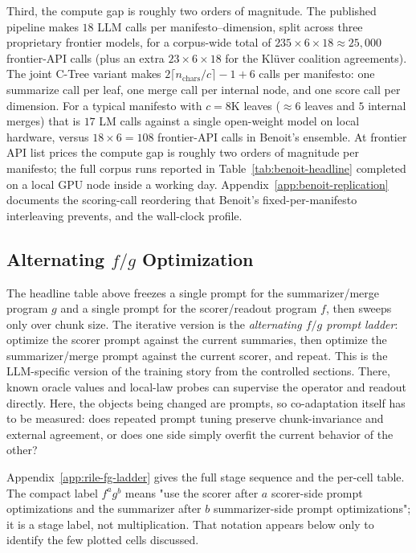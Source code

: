 Third, the compute gap is roughly two orders of magnitude. The published \citet{BenoitEtAl2025} pipeline makes $18$ LLM calls per
manifesto--dimension, split across three proprietary frontier models,
for a corpus-wide total of $235 \times 6 \times 18 \approx 25{,}000$
frontier-API calls (plus an extra $23 \times 6 \times 18$ for the
Kl\"uver coalition agreements). The joint C-Tree variant makes
$2\lceil n_{\text{chars}}/c\rceil - 1 + 6$ calls per manifesto: one
summarize call per leaf, one merge call per internal node, and one
score call per dimension. For a typical manifesto with $c = 8\mathrm{K}$
leaves ($\approx 6$ leaves and $5$ internal merges) that is $17$ LM
calls against a single open-weight model on local hardware, versus
$18 \times 6 = 108$ frontier-API calls in Benoit's ensemble. At frontier
API list prices the compute gap is roughly two orders of magnitude per
manifesto; the full corpus runs reported in
Table~\ref{tab:benoit-headline} completed on a local GPU node inside a
working day. Appendix~\ref{app:benoit-replication} documents the
scoring-call reordering that Benoit's fixed-per-manifesto interleaving
prevents, and the wall-clock profile.

\subsection[Alternating f/g Optimization]{Alternating $f/g$ Optimization}\label{sec:rile-fg-ladder}

The headline table above freezes a single prompt for the summarizer/merge
program $g$ and a single prompt for the scorer/readout program $f$, then
sweeps only over chunk size. The iterative version is the
\emph{alternating $f/g$ prompt ladder}: optimize the scorer prompt against
the current summaries, then optimize the summarizer/merge prompt against
the current scorer, and repeat. This is the LLM-specific version of the
training story from the controlled sections. There, known oracle values
and local-law probes can supervise the operator and readout directly.
Here, the objects being changed are prompts, so co-adaptation itself has
to be measured: does repeated prompt tuning preserve chunk-invariance and
external agreement, or does one side simply overfit the current behavior
of the other?

Appendix~\ref{app:rile-fg-ladder} gives the full stage sequence and the
per-cell table. The compact label $f^a g^b$ means "use the scorer after
$a$ scorer-side prompt optimizations and the summarizer after $b$
summarizer-side prompt optimizations"; it is a stage label, not
multiplication. That notation appears below only to identify the few
plotted cells discussed.

